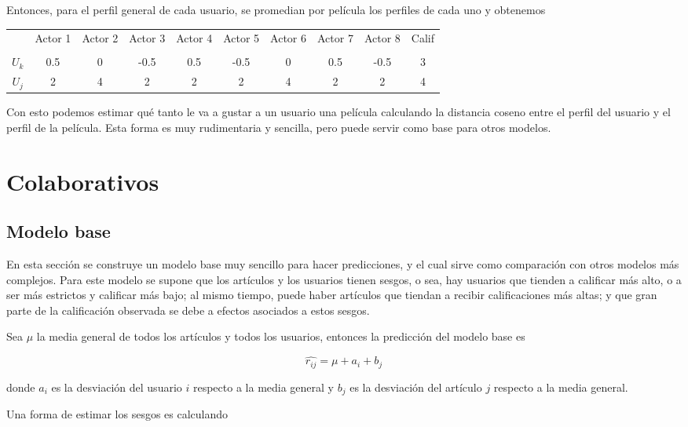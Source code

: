 Entonces, para el perfil general de cada usuario, se promedian por película los perfiles de cada uno y obtenemos

\begin{center}
\begin{tabular}{ c | c  c c c c c c c c}
    & Actor 1 & Actor 2 & Actor 3 & Actor 4 & Actor 5 & Actor 6 & Actor 7 & Actor 8 & Calif \\ \\
  \hline                       
$U_k$ & 0.5 & 0 & -0.5 & 0.5 & -0.5 & 0 & 0.5 & -0.5 & 3 \\
$U_j$ & 2 & 4 & 2 & 2 & 2 & 4 & 2 & 2 & 4 \\
  \hline  
\end{tabular}
\end{center}

Con esto podemos estimar qué tanto le va a gustar a un usuario una película calculando la distancia coseno entre el perfil del usuario y el perfil de la película. Esta forma es muy rudimentaria y sencilla, pero puede servir como base para otros modelos.

\section{Colaborativos}

\subsection{Modelo base}

En esta sección se construye un modelo base muy sencillo para hacer predicciones, y el cual sirve como comparación con otros modelos más complejos. Para este modelo se supone que los artículos y los usuarios tienen sesgos, o sea, hay usuarios que tienden a calificar más alto, o a ser más estrictos y calificar más bajo; al mismo tiempo, puede haber artículos que tiendan a recibir calificaciones más altas; y que gran parte de la calificación observada se debe a efectos asociados a estos sesgos.

Sea $\mu$ la media general de todos los artículos y todos los usuarios, entonces la predicción del modelo base es

\[
\hat{r_{ij}} = \mu + a_i + b_j
\]

donde $a_i$ es la desviación del usuario $i$ respecto a la media general y $b_j$ es la desviación del artículo $j$ respecto a la media general.

Una forma de estimar los sesgos es calculando

